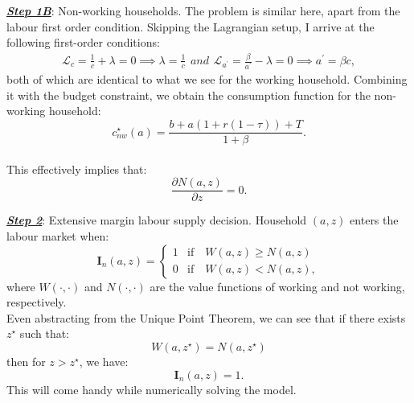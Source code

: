 \colorbox{BurntOrange!25}{\textbf{\textit{\underline{Step 1B}}}: Non-working households.}
The problem is similar here, apart from the labour first order condition. 
Skipping the Lagrangian setup, I arrive at the following first-order conditions:
\begin{subequations}
    \begin{align}
        \mathcal{L}_c= \frac{1}{c}+\lambda=0 \implies \lambda = \frac{1}{c}
    \end{align}
    and 
    \begin{align}
        \mathcal{L}_{a^\prime}=\frac{\beta}{a^\prime}-\lambda =0 \implies a^\prime = \beta c,
    \end{align}
\end{subequations}
both of which are identical to what we see for the working household. 
Combining it with the budget constraint, we obtain the consumption function for the non-working household:
\begin{equation}
    \boxed{c_{nw}^\star(a)=\frac{b +a(1+r(1-\tau))+T}{1+\beta}.}
\end{equation}\\

This effectively implies that:
\begin{equation}
    \boxed{\frac{\partial N(a,z)}{\partial z} =0.}\label{a1_nonworking_derivative}
\end{equation}

\colorbox{BurntOrange!25}{\textbf{\textit{\underline{Step 2}}}: Extensive margin labour supply decision.}
Household $\left(a,z\right)$ enters the labour market when:
\begin{equation}\label{a1_participation_decision}
    \mathbf{I}_n(a,z)=
    \begin{cases}
        1 & \text{if} \quad W(a,z)\geq N(a,z) \\
        0 & \text{if} \quad W(a,z) < N(a,z),
    \end{cases}
\end{equation}
where $W (\cdot, \cdot)$ and $N (\cdot, \cdot)$ are the value functions of working and not working, respectively. \\

Even abstracting from the Unique Point Theorem, we can see that if there exists $z^\star$ such that:
\begin{equation}
    W\left(a,z^\star\right)= N\left(a,z^\star\right)
\end{equation}
then for $z > z^\star$, we have:
\begin{equation}
    \mathbf{I}_n(a,z)=1.
\end{equation}
This will come handy while numerically solving the model. \\

